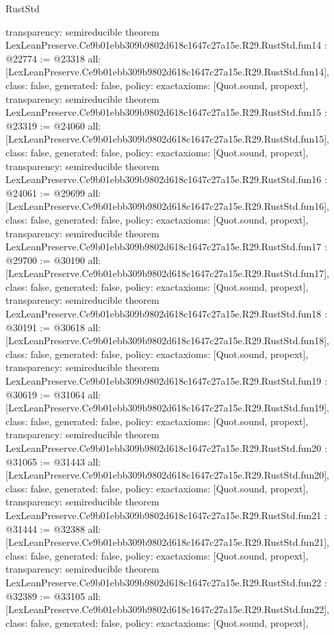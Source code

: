 \begin{lexlean}{RustStd}
\begin{coremodule}
{  transparency: semireducible
}
theorem LexLeanPreserve.Ce9b01ebb309b9802d618c1647c27a15e.R29.RustStd.fun14 : @22774 := @23318 {
  all: [LexLeanPreserve.Ce9b01ebb309b9802d618c1647c27a15e.R29.RustStd.fun14],
  class: false,
  generated: false,
  policy: exact{axioms: [Quot.sound, propext]},
  transparency: semireducible
}
theorem LexLeanPreserve.Ce9b01ebb309b9802d618c1647c27a15e.R29.RustStd.fun15 : @23319 := @24060 {
  all: [LexLeanPreserve.Ce9b01ebb309b9802d618c1647c27a15e.R29.RustStd.fun15],
  class: false,
  generated: false,
  policy: exact{axioms: [Quot.sound, propext]},
  transparency: semireducible
}
theorem LexLeanPreserve.Ce9b01ebb309b9802d618c1647c27a15e.R29.RustStd.fun16 : @24061 := @29699 {
  all: [LexLeanPreserve.Ce9b01ebb309b9802d618c1647c27a15e.R29.RustStd.fun16],
  class: false,
  generated: false,
  policy: exact{axioms: [Quot.sound, propext]},
  transparency: semireducible
}
theorem LexLeanPreserve.Ce9b01ebb309b9802d618c1647c27a15e.R29.RustStd.fun17 : @29700 := @30190 {
  all: [LexLeanPreserve.Ce9b01ebb309b9802d618c1647c27a15e.R29.RustStd.fun17],
  class: false,
  generated: false,
  policy: exact{axioms: [Quot.sound, propext]},
  transparency: semireducible
}
theorem LexLeanPreserve.Ce9b01ebb309b9802d618c1647c27a15e.R29.RustStd.fun18 : @30191 := @30618 {
  all: [LexLeanPreserve.Ce9b01ebb309b9802d618c1647c27a15e.R29.RustStd.fun18],
  class: false,
  generated: false,
  policy: exact{axioms: [Quot.sound, propext]},
  transparency: semireducible
}
theorem LexLeanPreserve.Ce9b01ebb309b9802d618c1647c27a15e.R29.RustStd.fun19 : @30619 := @31064 {
  all: [LexLeanPreserve.Ce9b01ebb309b9802d618c1647c27a15e.R29.RustStd.fun19],
  class: false,
  generated: false,
  policy: exact{axioms: [Quot.sound, propext]},
  transparency: semireducible
}
theorem LexLeanPreserve.Ce9b01ebb309b9802d618c1647c27a15e.R29.RustStd.fun20 : @31065 := @31443 {
  all: [LexLeanPreserve.Ce9b01ebb309b9802d618c1647c27a15e.R29.RustStd.fun20],
  class: false,
  generated: false,
  policy: exact{axioms: [Quot.sound, propext]},
  transparency: semireducible
}
theorem LexLeanPreserve.Ce9b01ebb309b9802d618c1647c27a15e.R29.RustStd.fun21 : @31444 := @32388 {
  all: [LexLeanPreserve.Ce9b01ebb309b9802d618c1647c27a15e.R29.RustStd.fun21],
  class: false,
  generated: false,
  policy: exact{axioms: [Quot.sound, propext]},
  transparency: semireducible
}
theorem LexLeanPreserve.Ce9b01ebb309b9802d618c1647c27a15e.R29.RustStd.fun22 : @32389 := @33105 {
  all: [LexLeanPreserve.Ce9b01ebb309b9802d618c1647c27a15e.R29.RustStd.fun22],
  class: false,
  generated: false,
  policy: exact{axioms: [Quot.sound, propext]},
}
\end{coremodule}
\end{lexlean}

